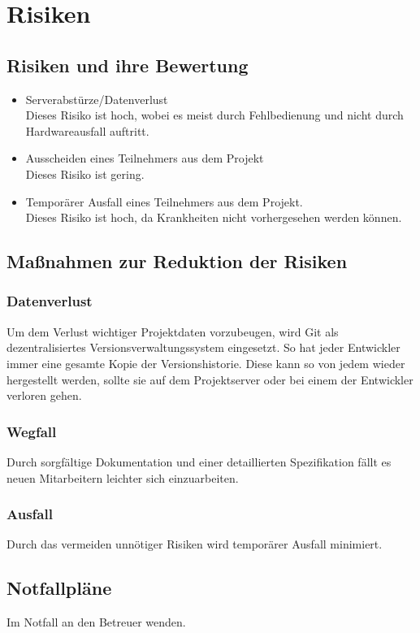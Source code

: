 \documentclass[a4paper,10pt]{scrartcl}
\begin{document}
\section{Risiken}
\subsection{Risiken und ihre Bewertung}
\begin{itemize}
\item Serverabstürze/Datenverlust\\
Dieses Risiko ist hoch, wobei es meist durch Fehlbedienung und nicht durch Hardwareausfall auftritt.
\item Ausscheiden eines Teilnehmers aus dem Projekt\\
Dieses Risiko ist gering.
\item Temporärer Ausfall eines Teilnehmers aus dem Projekt.\\
Dieses Risiko ist hoch, da Krankheiten nicht vorhergesehen werden können.
\end{itemize}


\subsection{Maßnahmen zur Reduktion der Risiken}
\subsubsection{Datenverlust}
Um dem Verlust wichtiger Projektdaten vorzubeugen, wird Git als dezentralisiertes Versionsverwaltungssystem eingesetzt.
So hat jeder Entwickler immer eine gesamte Kopie der Versionshistorie. Diese kann so von jedem wieder hergestellt werden, sollte sie auf dem Projektserver oder bei einem der Entwickler verloren gehen.
\subsubsection{Wegfall}
Durch sorgfältige Dokumentation und einer detaillierten Spezifikation fällt es neuen Mitarbeitern leichter sich einzuarbeiten.
\subsubsection{Ausfall}
Durch das vermeiden unnötiger Risiken wird temporärer Ausfall minimiert.
\subsection{Notfallpläne}
Im Notfall an den Betreuer wenden.
\end{document}
